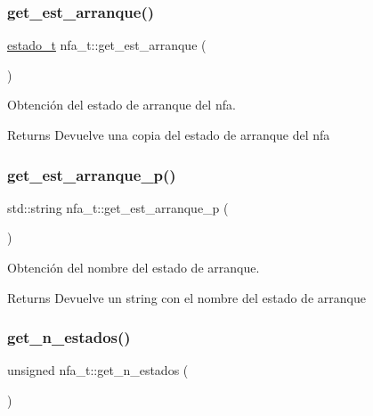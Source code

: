 \subsubsection{\texorpdfstring{get\+\_\+est\+\_\+arranque()}{get\_est\_arranque()}}
{\footnotesize\ttfamily \hyperlink{classestado__t}{estado\+\_\+t} nfa\+\_\+t\+::get\+\_\+est\+\_\+arranque (\begin{DoxyParamCaption}{ }\end{DoxyParamCaption})}



Obtención del estado de arranque del nfa. 

\begin{DoxyReturn}{Returns}
Devuelve una copia del estado de arranque del nfa 
\end{DoxyReturn}
\mbox{\label{classnfa__t_a2a51944fd1b071bc432753d1cbc68fad}} 
\subsubsection{\texorpdfstring{get\+\_\+est\+\_\+arranque\+\_\+p()}{get\_est\_arranque\_p()}}
{\footnotesize\ttfamily std\+::string nfa\+\_\+t\+::get\+\_\+est\+\_\+arranque\+\_\+p (\begin{DoxyParamCaption}{ }\end{DoxyParamCaption})}



Obtención del nombre del estado de arranque. 

\begin{DoxyReturn}{Returns}
Devuelve un string con el nombre del estado de arranque 
\end{DoxyReturn}
\mbox{\label{classnfa__t_a625c266cc754a846089b604a611ed31e}} 
\subsubsection{\texorpdfstring{get\+\_\+n\+\_\+estados()}{get\_n\_estados()}}
{\footnotesize\ttfamily unsigned nfa\+\_\+t\+::get\+\_\+n\+\_\+estados (\begin{DoxyParamCaption}{ }\end{DoxyParamCaption})\hspace{0.3cm}{\ttfamily [inline]}}



